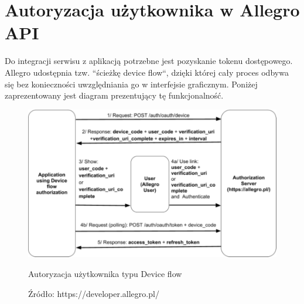
\section{Autoryzacja użytkownika w Allegro API}

Do integracji serwisu z aplikacją potrzebne jest pozyskanie tokenu dostępowego. Allegro udostępnia tzw. ``ścieżkę device flow``, dzięki której cały proces odbywa się bez konieczności uwzględniania go w interfejsie graficznym. Poniżej zaprezentowany jest diagram prezentujący tę funkcjonalność.

\begin{figure}[H]
	\centering
	\includegraphics[width=\linewidth]{device_flow.pdf}
	\caption{Autoryzacja użytkownika typu Device flow}
	\caption*{Źródło: {https://developer.allegro.pl/}}
\end{figure}

